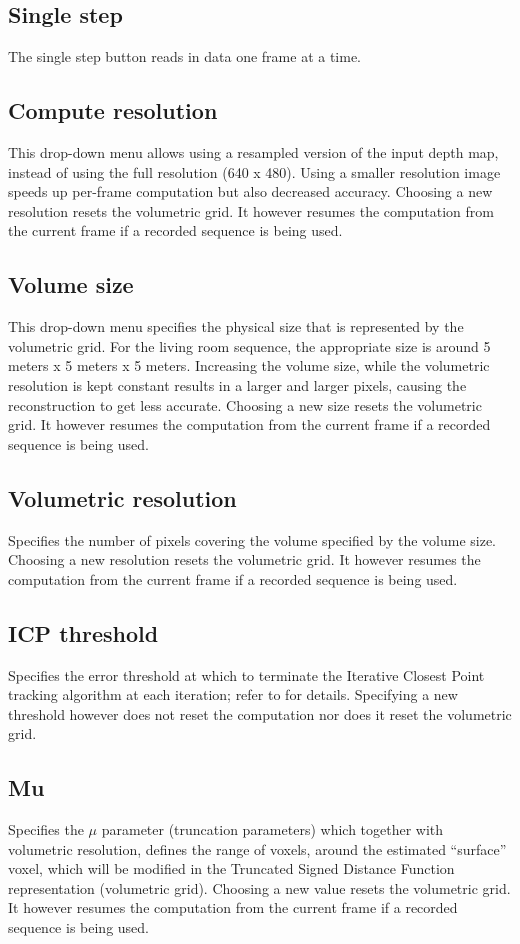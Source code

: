 \documentclass[12pt]{article}
\begin{document}
\subsection{Single step}
The single step button reads in data one frame at a time.

\subsection{Compute resolution}
This drop-down menu allows using a resampled version of the input depth map, instead of using the full resolution (640 x 480). Using a smaller resolution image speeds up per-frame computation but also decreased accuracy. Choosing a new resolution resets the volumetric grid. It however resumes the computation from the current frame if a recorded sequence is being used.

\subsection{Volume size}
This drop-down menu specifies the physical size that is represented by the volumetric grid. For the living room sequence, the appropriate size is around 5 meters x 5 meters x 5 meters. Increasing the volume size, while the volumetric resolution is kept constant results in a larger and larger pixels, causing the reconstruction to get less accurate. Choosing a new size resets the volumetric grid. It however resumes the computation from the current frame if a recorded sequence is being used.

\subsection{Volumetric resolution}
Specifies the number of pixels covering the volume specified by the volume size. Choosing a new resolution resets the volumetric grid. It however resumes the computation from the current frame if a recorded sequence is being used. 

\subsection{ICP threshold}
Specifies the error threshold at which to terminate the Iterative Closest Point tracking algorithm at each iteration; refer to \cite{2014Nardi} for details. Specifying a new threshold however does not reset the computation nor does it reset the volumetric grid.

\subsection{Mu}
Specifies the $\mu$ parameter (truncation parameters) which together with volumetric resolution, defines the range of voxels, around the estimated ``surface'' voxel, which will be modified in the Truncated Signed Distance Function representation (volumetric grid). Choosing a new value resets the volumetric grid. It however resumes the computation from the current frame if a recorded sequence is being used. 
\end{document}
